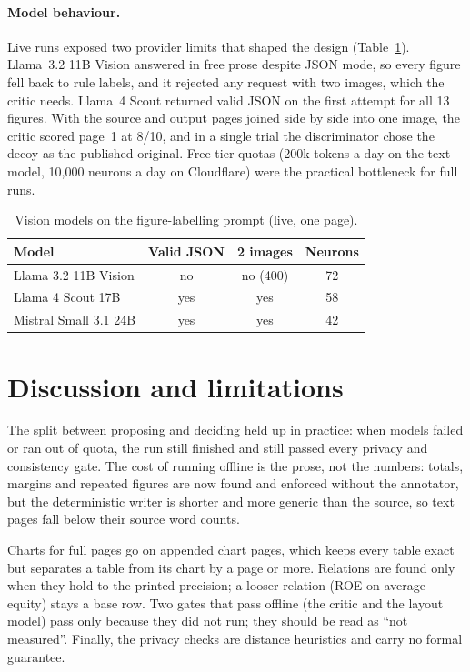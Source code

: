 \documentclass[10pt,twocolumn]{article}
\begin{document}
\paragraph{Model behaviour.} Live runs exposed two provider limits that shaped the design
(Table~\ref{tab:vision}). Llama~3.2 11B Vision answered in free prose despite JSON mode, so every
figure fell back to rule labels, and it rejected any request with two images, which the critic
needs. Llama~4 Scout returned valid JSON on the first attempt for all 13 figures. With the source
and output pages joined side by side into one image, the critic scored page~1 at 8/10, and in a
single trial the discriminator chose the decoy as the published original. Free-tier quotas (200k tokens a day on
the text model, 10,000 neurons a day on Cloudflare) were the practical bottleneck for full runs.

\begin{table}[t]
\centering
\small
\caption{Vision models on the figure-labelling prompt (live, one page).}
\label{tab:vision}
\begin{tabular}{@{}lccc@{}}
\toprule
Model & Valid JSON & 2 images & Neurons \\
\midrule
Llama 3.2 11B Vision   & no  & no (400) & 72 \\
Llama 4 Scout 17B      & yes & yes      & 58 \\
Mistral Small 3.1 24B  & yes & yes      & 42 \\
\bottomrule
\end{tabular}
\end{table}

\section{Discussion and limitations}

The split between proposing and deciding held up in practice: when models failed or ran out of
quota, the run still finished and still passed every privacy and consistency gate. The cost of
running offline is the prose, not the numbers: totals, margins and repeated figures are now found
and enforced without the annotator, but the deterministic writer is shorter and more generic than
the source, so text pages fall below their source word counts.

Charts for full pages go on appended chart pages, which keeps every table exact but separates a
table from its chart by a page or more. Relations are found only when they hold to the printed
precision; a looser relation (ROE on average equity) stays a base row. Two gates that pass offline
(the critic and the layout model) pass only because they did not run; they should be read as
``not measured''. Finally, the privacy checks are distance heuristics and carry no formal
guarantee.
\end{document}
